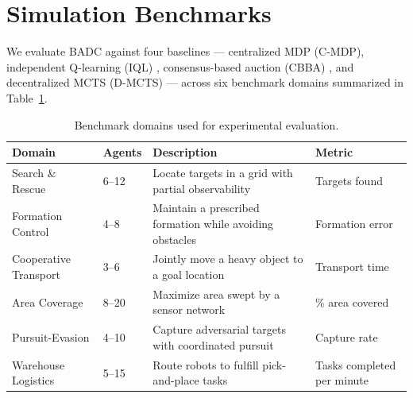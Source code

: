 \section{Simulation Benchmarks}

We evaluate BADC against four baselines --- centralized MDP (C-MDP), independent
Q-learning (IQL) \citep{tan1993multi}, consensus-based auction (CBBA)
\citep{choi2009consensus}, and decentralized MCTS (D-MCTS)
\citep{claes2017decentralized} --- across six benchmark domains summarized in
Table~\ref{tab:benchmarks}.

\begin{table}[htbp]
\centering
\caption{Benchmark domains used for experimental evaluation.}
\label{tab:benchmarks}
\vspace{4pt}
\begin{tabular}{@{}p{3cm} p{2cm} p{4.5cm} p{2.5cm}@{}}
\toprule
\color{jhublue}\textbf{Domain} &
\color{jhublue}\textbf{Agents} &
\color{jhublue}\textbf{Description} &
\color{jhublue}\textbf{Metric} \\
\midrule
Search \& Rescue   & 6--12 & Locate targets in a grid with partial observability  & Targets found                \\
Formation Control  & 4--8  & Maintain a prescribed formation while avoiding obstacles& Formation error              \\
Cooperative Transport & 3--6 & Jointly move a heavy object to a goal location        & Transport time               \\
Area Coverage      & 8--20 & Maximize area swept by a sensor network               & \% area covered              \\
Pursuit-Evasion    & 4--10 & Capture adversarial targets with coordinated pursuit  & Capture rate                 \\
Warehouse Logistics& 5--15 & Route robots to fulfill pick-and-place tasks          & Tasks completed per minute   \\
\bottomrule
\end{tabular}
\vspace{4pt}
\end{table}
